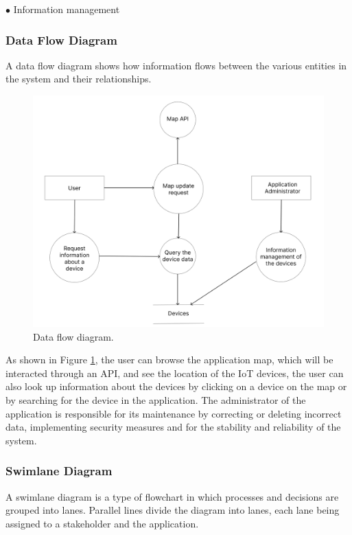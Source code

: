 $\bullet$ Information management

\subsubsection{Data Flow Diagram}

A data flow diagram shows how information flows between the various entities
in the system and their relationships.

\begin{figure}[H]
    \centering
    \includegraphics[width=15cm]{../app/docs/software_requirements/assets/images/data_flow_diagram.png}
    \caption{Data flow diagram.}
    \label{fig:data flow diagram}
\end{figure}

As shown in Figure \ref{fig:data flow diagram}, the user can browse the application
map, which will be interacted through an API,
and see the location of the IoT devices, the user can also look up information
about the devices by clicking on a device on the map or by searching for
the device in the application. The administrator of the application is responsible for
its maintenance by correcting or deleting incorrect data, implementing security
measures and for the stability and reliability of the system.

\subsubsection{Swimlane Diagram}

A swimlane diagram is a type of flowchart in which processes and decisions
are grouped into lanes. Parallel lines divide the diagram into lanes, each
lane being assigned to a stakeholder and the application.

